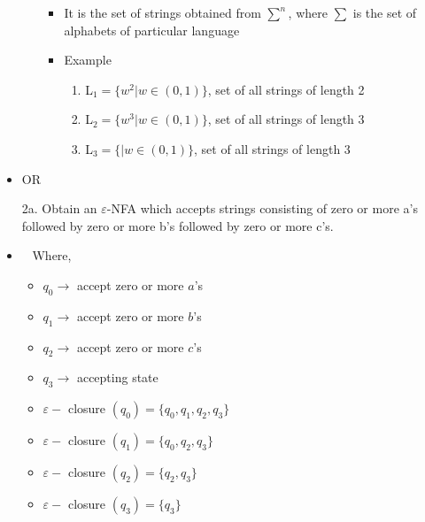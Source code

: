 \documentclass{article}
\def \answer{\item [$\rightarrow$]}
\def \OR{\item [] \hfill OR \hfill~\!}
\begin{document}
\begin{itemize}
\begin{enumerate}[label=\roman*)]
\begin{itemize}
						\item It is the set of strings obtained from $\sum^n$, where $\sum$ is the set of
							alphabets of particular language
						\item Example
							\begin{enumerate}[label=\alph*)]
								\item L$_1=\{w^2|w\in(0,1)\}$, set of all strings of length 2
								\item L$_2=\{w^3|w\in(0,1)\}$, set of all strings of length 3
								\item L$_3=\{|w\in(0,1)\}$, set of all strings of length 3
							\end{enumerate}
					\end{itemize}
			\end{enumerate}
		\OR
		\item [2a.] Obtain an $\varepsilon$-NFA which accepts strings consisting of zero or more a’s followed by
			zero or more b’s followed by zero or more c’s.
		\answer ~
			Where,
			\begin{itemize}
				\item $q_0 \rightarrow$ accept zero or more $a$'s
				\item $q_1 \rightarrow$ accept zero or more $b$'s
				\item $q_2 \rightarrow$ accept zero or more $c$'s
				\item $q_3 \rightarrow$ accepting state
				\item $\varepsilon-$ closure $(q_0)=\{q_0,q_1,q_2,q_3\}$
				\item $\varepsilon-$ closure $(q_1)=\{q_0,q_2,q_3\}$
				\item $\varepsilon-$ closure $(q_2)=\{q_2,q_3\}$
				\item $\varepsilon-$ closure $(q_3)=\{q_3\}$
			\end{itemize}
		\newpage


\end{itemize}
\end{document}
